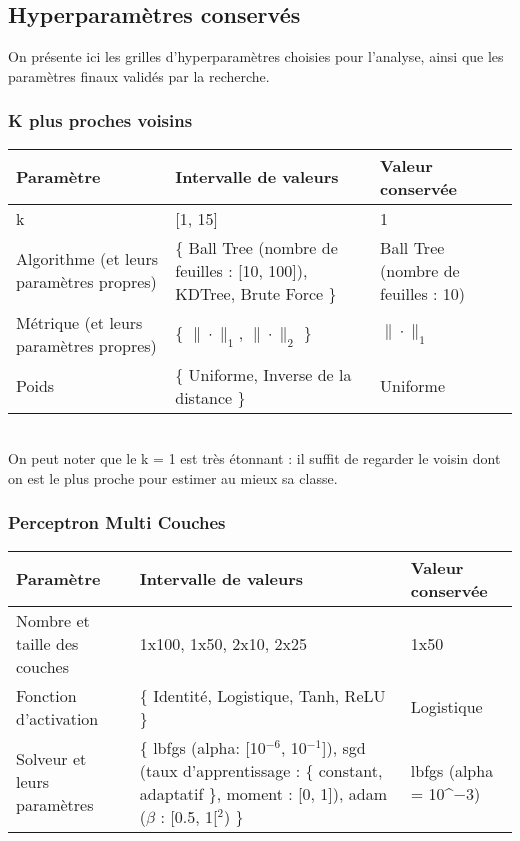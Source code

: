 \subsection{Hyperparamètres conservés}

On présente ici les grilles d'hyperparamètres choisies pour l'analyse, ainsi que les paramètres finaux validés par la recherche.

\subsubsection*{K plus proches voisins}

\noindent
\begin{tabularx}{\textwidth}{|X|X|X|}
    \hline
    \bf{Paramètre} & \bf{Intervalle de valeurs} & \bf{Valeur conservée}\\
    \hline
    k & [1, 15] & 1\\\hline
    Algorithme (et leurs paramètres propres) & \{ Ball Tree (nombre de feuilles : [10, 100]), KDTree, Brute Force \} & Ball Tree (nombre de feuilles : 10)\\\hline
    Métrique (et leurs paramètres propres) & \{ $\|\cdot\|_1$, $\|\cdot\|_2$ \} & $\|\cdot\|_1$\\\hline
    Poids & \{ Uniforme, Inverse de la distance \} & Uniforme\\\hline
\end{tabularx}\\

On peut noter que le k = 1 est très étonnant : il suffit de regarder le voisin dont on est le plus proche pour estimer au mieux sa classe.

\subsubsection*{Perceptron Multi Couches}

\noindent
\begin{tabularx}{\textwidth}{|X|X|X|}
    \hline
    \bf{Paramètre} & \bf{Intervalle de valeurs} & \bf{Valeur conservée}\\
    \hline
    Nombre et taille des couches  & 1x100, 1x50, 2x10, 2x25 & 1x50 \\\hline
    Fonction d'activation & \{ Identité, Logistique, Tanh, ReLU \} & Logistique \\\hline
    Solveur et leurs paramètres & \{ lbfgs (alpha: [10$^{-6}$, 10$^{-1}$]), sgd (taux d'apprentissage : \{ constant, adaptatif \}, moment : [0, 1]), adam ($\beta$ : [0.5, 1[$^2$) \} & lbfgs (alpha = 10^${-3}$)\\\hline
\end{tabularx}

